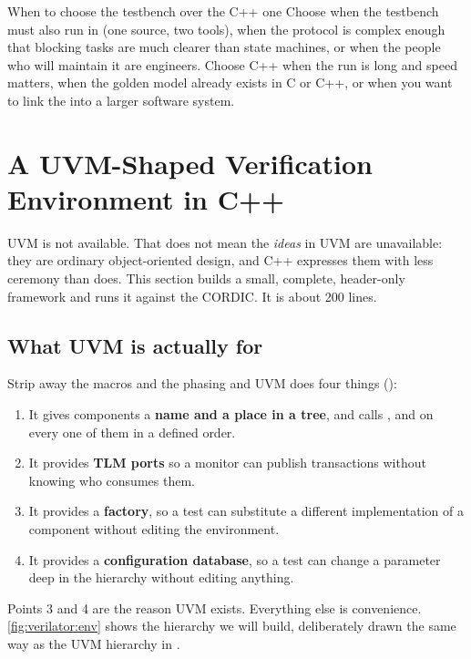 \begin{notebox}{When to choose the \SV{} testbench over the C++ one}
Choose \SV{} when the testbench must also run in  (one source,
two tools), when the protocol is complex enough that blocking tasks are much
clearer than state machines, or when the people who will maintain it are \RTL{}
engineers. Choose C++ when the run is long and speed matters, when the golden
model already exists in C or C++, or when you want to link the \DUT{} into a
larger software system.
\end{notebox}

\section{A UVM-Shaped Verification Environment in C++}
\label{sec:verilator:cppuvm}

UVM is not available. That does not mean the \emph{ideas} in UVM are
unavailable: they are ordinary object-oriented design, and C++ expresses them
with less ceremony than \SV{} does. This section builds a small, complete,
header-only framework and runs it against the CORDIC. It is about 200 lines.

\subsection{What UVM is actually for}

Strip away the macros and the phasing and UVM does four things ():

\begin{enumerate}
  \item It gives components a \textbf{name and a place in a tree}, and calls
        ,  and  on
        every one of them in a defined order.
  \item It provides \textbf{TLM ports} so a monitor can publish transactions
        without knowing who consumes them.
  \item It provides a \textbf{factory}, so a test can substitute a different
        implementation of a component without editing the environment.
  \item It provides a \textbf{configuration database}, so a test can change a
        parameter deep in the hierarchy without editing anything.
\end{enumerate}

Points 3 and 4 are the reason UVM exists. Everything else is convenience.
\cref{fig:verilator:env} shows the hierarchy we will build, deliberately drawn
the same way as the UVM hierarchy in .

